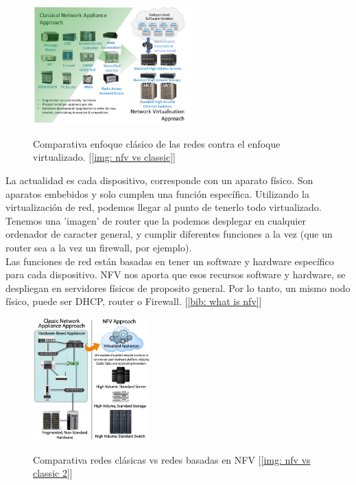 \documentclass[12pt]{article}
\begin{document}
	\begin{figure}[h]
		\begin{center}
			\includegraphics[width=0.55\textwidth]{img/classic_network_vs_nfv.png}
			\label{imagen comparativa classic network nfv}
			\caption{Comparativa enfoque clásico de las redes contra el enfoque virtualizado. [\ref{img: nfv vs classic}]}
		\end{center}
	\end{figure}

	\pagebreak
	
	\noindent La actualidad es cada dispositivo, corresponde con un aparato físico. Son aparatos embebidos y solo cumplen una función específica. Utilizando la virtualización de red, podemos llegar al punto de tenerlo todo virtualizado. Tenemos una 'imagen' de router que la podemos desplegar en cualquier ordenador de caracter general, y cumplir diferentes funciones a la vez (que un router sea a la vez un firewall, por ejemplo).\\
	
	\noindent Las funciones de red están basadas en tener un software y hardware específico para cada dispositivo. NFV nos aporta que esos recursos software y hardware, se despliegan en servidores físicos de proposito general. Por lo tanto, un mismo nodo físico, puede ser DHCP, router o Firewall. [\ref{bib: what is nfv}]\\
	
	\begin{figure}[h!]
		\begin{center}
			\includegraphics[width=0.4\textwidth]{img/NFV-image-v2.jpg}
			\label{img: comparativa redes classic vs nfv}
			\caption{Comparativa redes clásicas vs redes basadas en NFV [\ref{img: nfv vs classic 2}]}
		\end{center}
	\end{figure}
\end{document}
